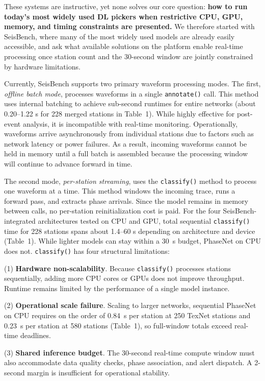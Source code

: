 These systems are instructive, yet none solves our core question: \textbf{how to run today’s most widely used DL pickers when restrictive CPU, GPU, memory, and timing constraints are presented.} We therefore started with SeisBench, where many of the most widely used models are already easily accessible, and ask what available solutions on the platform enable real-time processing once station count and the 30-second window are jointly constrained by hardware limitations.

Currently, SeisBench supports two primary waveform processing modes. The first, \emph{offline batch mode}, processes waveforms in a single \texttt{annotate()} call. This method uses internal batching to achieve sub-second runtimes for entire networks (about 0.20--1.22 s for 228 merged stations in Table~1). While highly effective for post-event analysis, it is incompatible with real-time monitoring. Operationally, waveforms arrive asynchronously from individual stations due to factors such as network latency or power failures. As a result, incoming waveforms cannot be held in memory until a full batch is assembled because the processing window will continue to advance forward in time.

The second mode, \emph{per-station streaming}, uses the \texttt{classify()} method to process one waveform at a time. This method windows the incoming trace, runs a forward pass, and extracts phase arrivals. Since the model remains in memory between calls, no per-station reinitialization cost is paid. For the four SeisBench-integrated architectures tested on CPU and GPU, total sequential \texttt{classify()} time for 228 stations spans about 1.4--60 s depending on architecture and device (Table~1). While lighter models can stay within a 30~s budget, PhaseNet on CPU does not. \texttt{classify()} has four structural limitations:

(1) \textbf{Hardware non-scalability}. Because \texttt{classify()} processes stations sequentially, adding more CPU cores or GPUs does not improve throughput. Runtime remains limited by the performance of a single model instance.

(2) \textbf{Operational scale failure}. Scaling to larger networks, sequential PhaseNet on CPU requires on the order of 0.84~s per station at 250 TexNet stations and 0.23~s per station at 580 stations (Table~1), so full-window totals exceed real-time deadlines.

(3) \textbf{Shared inference budget}. The 30-second real-time compute window must also accommodate data quality checks, phase association, and alert dispatch. A 2-second margin is insufficient for operational stability.

